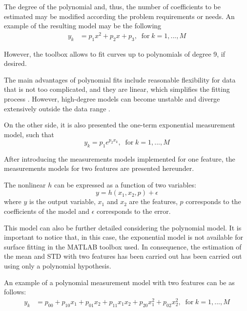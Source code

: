 \documentclass[a4paper, report, oneside, UKenglish]{memoir}
\begin{document}
The degree of the polynomial and, thus, the number of coefficients to be estimated may be modified according the problem requirements or needs. 
An example of the resulting model may be the following
\begin{equation}
\begin{split}
    y_k &= p_{1}x^{2} + p_{2}x + p_3,    \;\;\mbox{for}\; k = 1,...,M
\end{split}
\end{equation}

However, the toolbox allows to fit curves up to polynomials of degree 9, if desired. 

The main advantages of polynomial fits include reasonable flexibility for data that is not too complicated, and they are linear, which simplifies the fitting process \cite{MathWorksRegression}. However, high-degree models can become unstable and diverge extensively outside the data range \cite{MathWorksRegression}. 

On the other side, it is also presented the one-term exponential measurement model, such that 
\begin{equation}
    y_k = p_{1}e^{p_{2}x_{k}},  \;\;\mbox{for}\; k = 1,...,M
\end{equation}

After introducing the measurements models implemented for one feature, the measurements models for two features are presented hereunder.

The nonlinear $h$ can be expressed as a function of two variables:
\begin{equation}
    y = h(x_{1},x_{2},p) + \epsilon
\end{equation}
where $y$ is the output variable, $x_{1}$ and $x_{2}$ are the features, $p$ corresponds to the coefficients of the model and $\epsilon$ corresponds to the error. 

This model can also be further detailed considering the polynomial model. It is important to notice that, in this case, the exponential model is not available for surface fitting in the MATLAB toolbox used. In consequence, the estimation of the mean and STD with two features has been carried out has been carried out using only a polynomial hypothesis.

An example of a polynomial measurement model with two features can be as follows:
\begin{equation}
\begin{split}
    y_k &= p_{00} + p_{10}x_{1} + p_{01}x_{2} + p_{11}x_{1}x_{2} + p_{20}x^{2}_{1} + p_{02}x^{2}_{2},    \;\;\mbox{for}\; k = 1,...,M
\end{split}
\end{equation}
\end{document}
